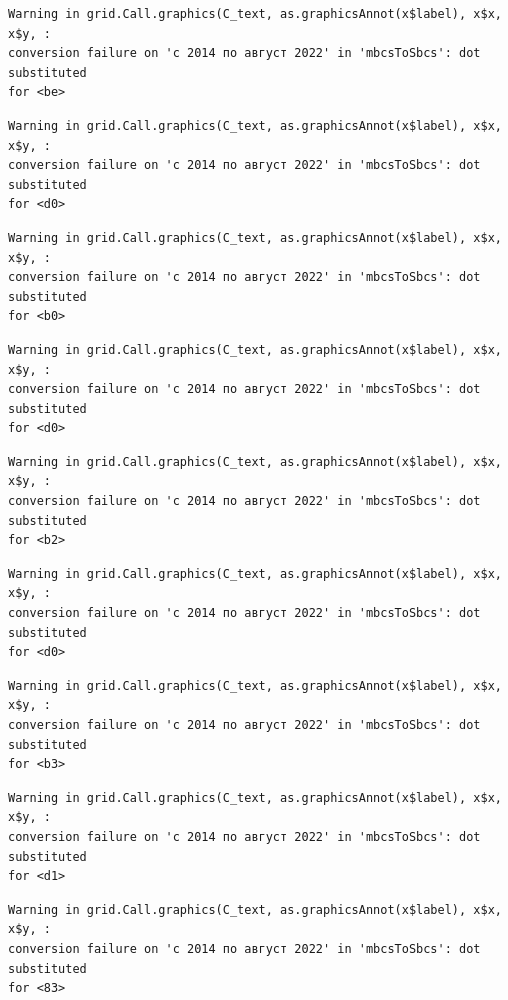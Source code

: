 \documentclass[
  letterpaper,
  DIV=11,
  numbers=noendperiod]{scrartcl}
\begin{document}
\begin{verbatim}
Warning in grid.Call.graphics(C_text, as.graphicsAnnot(x$label), x$x, x$y, :
conversion failure on 'с 2014 по август 2022' in 'mbcsToSbcs': dot substituted
for <be>
\end{verbatim}

\begin{verbatim}
Warning in grid.Call.graphics(C_text, as.graphicsAnnot(x$label), x$x, x$y, :
conversion failure on 'с 2014 по август 2022' in 'mbcsToSbcs': dot substituted
for <d0>
\end{verbatim}

\begin{verbatim}
Warning in grid.Call.graphics(C_text, as.graphicsAnnot(x$label), x$x, x$y, :
conversion failure on 'с 2014 по август 2022' in 'mbcsToSbcs': dot substituted
for <b0>
\end{verbatim}

\begin{verbatim}
Warning in grid.Call.graphics(C_text, as.graphicsAnnot(x$label), x$x, x$y, :
conversion failure on 'с 2014 по август 2022' in 'mbcsToSbcs': dot substituted
for <d0>
\end{verbatim}

\begin{verbatim}
Warning in grid.Call.graphics(C_text, as.graphicsAnnot(x$label), x$x, x$y, :
conversion failure on 'с 2014 по август 2022' in 'mbcsToSbcs': dot substituted
for <b2>
\end{verbatim}

\begin{verbatim}
Warning in grid.Call.graphics(C_text, as.graphicsAnnot(x$label), x$x, x$y, :
conversion failure on 'с 2014 по август 2022' in 'mbcsToSbcs': dot substituted
for <d0>
\end{verbatim}

\begin{verbatim}
Warning in grid.Call.graphics(C_text, as.graphicsAnnot(x$label), x$x, x$y, :
conversion failure on 'с 2014 по август 2022' in 'mbcsToSbcs': dot substituted
for <b3>
\end{verbatim}

\begin{verbatim}
Warning in grid.Call.graphics(C_text, as.graphicsAnnot(x$label), x$x, x$y, :
conversion failure on 'с 2014 по август 2022' in 'mbcsToSbcs': dot substituted
for <d1>
\end{verbatim}

\begin{verbatim}
Warning in grid.Call.graphics(C_text, as.graphicsAnnot(x$label), x$x, x$y, :
conversion failure on 'с 2014 по август 2022' in 'mbcsToSbcs': dot substituted
for <83>
\end{verbatim}
\end{document}
